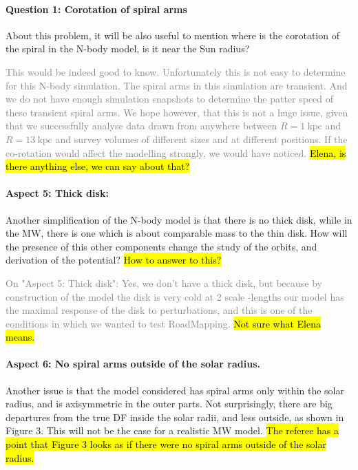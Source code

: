 \documentclass[10pt,a4paper]{article}
\newcommand{\Answer}[1]{\textcolor{Gray}{#1}}
\begin{document}
\paragraph{Question 1: Corotation of spiral arms} About this problem, it will be also useful to mention where is the corotation of the
spiral in the N-body model, is it near the Sun radius?

\Answer{This would be indeed good to know. Unfortunately this is not easy to determine for this N-body simulation. The spiral arms in this simulation are transient. And we do not have enough simulation snapshots to determine the patter speed of these transient spiral arms. We hope however, that this is not a huge issue, given that we successfully analyse data drawn from anywhere between $R=1~\text{kpc}$ and $R=13~\text{kpc}$ and survey volumes of different sizes and at different positions. If the co-rotation would affect the modelling strongly, we would have noticed.} \hl{Elena, is there anything else, we can say about that?}

\paragraph{Aspect 5: Thick disk:} Another simplification of the N-body model is that there is no thick disk, while in
the MW, there is one which is about comparable mass to the thin disk. How will the
presence of this other components change the study of the orbits, and derivation of
the potential? \hl{How to answer to this?} 

\Answer{On "Aspect 5: Thick disk": Yes, we don't have a thick 
disk, but because by construction of the model the disk is very cold at 
2 scale -lengths our model has the maximal response of the disk to 
perturbations, and this is one of the conditions in which we wanted to 
test RoadMapping.} \hl{Not sure what Elena means.}

\paragraph{Aspect 6: No spiral arms outside of the solar radius.} Another issue is that the model considered has spiral arms only within the solar
radius, and is axisymmetric in the outer parts. Not surprisingly, there are big
departures from the true DF inside the solar radii, and less outside, as shown in
Figure 3. This will not be the case for a realistic MW model. \hl{The referee has a point that Figure 3 looks as if there were no spiral arms outside of the solar radius.}
\end{document}
